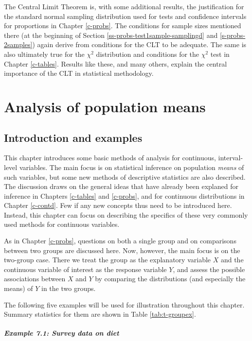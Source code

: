 \documentclass[11pt,a4paper,openany]{book}
\let\oldparagraph\paragraph
\renewcommand{\paragraph}[1]{\oldparagraph{#1}\mbox{}}
\begin{document}
The Central Limit Theorem is, with some additional results, the
justification for the standard normal sampling distribution used for
tests and confidence intervals for proportions in Chapter \ref{c-probs}.
The conditions for sample sizes mentioned there (at the beginning of
Section \ref{ss-probs-test1sample-samplingd} and \ref{s-probs-2samples})
again derive from conditions for the CLT to be adequate. The same is
also ultimately true for the \(\chi^{2}\) distribution and conditions
for the \(\chi^{2}\) test in Chapter \ref{c-tables}. Results like these,
and many others, explain the central importance of the CLT in
statistical methodology.

\chapter{Analysis of population means}\label{c-means}

\section{Introduction and examples}\label{s-means-intro}

This chapter introduces some basic methods of analysis for continuous,
interval-level variables. The main focus is on statistical inference on
population \emph{means} of such variables, but some new methods of
descriptive statistics are also described. The discussion draws on the
general ideas that have already been explaned for inference in Chapters
\ref{c-tables} and \ref{c-probs}, and for continuous distributions in
Chapter \ref{c-contd}. Few if any new concepts thus need to be
introduced here. Instead, this chapter can focus on describing the
specifics of these very commonly used methods for continuous variables.

As in Chapter \ref{c-probs}, questions on both a single group and on
comparisons between two groups are discussed here. Now, however, the
main focus is on the two-group case. There we treat the group as the
explanatory variable \(X\) and the continuous variable of interest as
the response variable \(Y\), and assess the possible associations
between \(X\) and \(Y\) by comparing the distributions (and especially
the means) of \(Y\) in the two groups.

The following five examples will be used for illustration throughout
this chapter. Summary statistics for them are shown in Table
\ref{tab:t-groupex}.

\paragraph{Example 7.1: Survey data on diet}\label{p-ex71}
\end{document}
